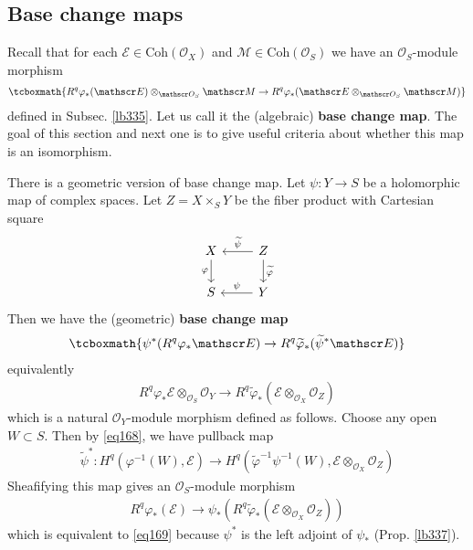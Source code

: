 \documentclass[12pt,b5paper,notitlepage]{report}
\theoremstyle{definition}
\theoremstyle{plain}
\newcommand{\wtd}{\widetilde}
\newcommand{\scr}{\mathscr}
\newcommand{\Coh}{\mathrm{Coh}}
\numberwithin{equation}{section}
\begin{document}
\subsection{Base change maps}

Recall that for each $\scr E\in\Coh(\scr O_X)$ and $\scr M\in\Coh(\scr O_S)$ we have an $\scr O_S$-module morphism 
\begin{align}
\tcboxmath{R^q\varphi_*(\scr E)\otimes_{\scr O_S}\scr M\rightarrow R^q\varphi_*(\scr E\otimes_{\scr O_S}\scr M)}   \label{eq167}
\end{align}
defined in Subsec. \ref{lb335}. Let us call it the (algebraic) \textbf{base change map}.  The goal of this section and next one is to give useful criteria about whether this map is an isomorphism. 

There is a geometric version of base change map. Let $\psi:Y\rightarrow S$ be a holomorphic map of complex spaces. Let $Z=X\times_SY$ be the fiber product with Cartesian square
\begin{equation}\label{eq171}
\begin{tikzcd}
X \arrow[d, "\varphi"'] & Z \arrow[l, "\wtd\psi"'] \arrow[d, "\wtd\varphi"] \\
S                       & Y \arrow[l, "\psi"']                             
\end{tikzcd}
\end{equation}
Then we have the (geometric) \textbf{base change map} 
\begin{align}
\tcboxmath{\psi^*(R^q\varphi_*\scr E)\rightarrow R^q\wtd\varphi_*(\wtd\psi^*\scr E)} \label{eq169}
\end{align}
equivalently
\begin{align*}
R^q\varphi_*\scr E\otimes_{\scr O_S}\scr O_Y\rightarrow R^q\wtd\varphi_*(\scr E\otimes_{\scr O_X}\scr O_Z)
\end{align*}
which is a natural $\scr O_Y$-module morphism defined as follows. Choose any open $W\subset S$. Then by \eqref{eq168}, we have pullback map 
\begin{align*}
\wtd\psi^*: H^q(\varphi^{-1}(W),\scr E)\rightarrow H^q(\wtd\varphi^{-1}\psi^{-1}(W),\scr E\otimes_{\scr O_X}\scr O_Z)
\end{align*}
Sheafifying this map gives an $\scr O_S$-module morphism
\begin{align*}
R^q\varphi_*(\scr E)\rightarrow \psi_* (R^q\wtd\varphi_*(\scr E\otimes_{\scr O_X}\scr O_Z))
\end{align*}
which is equivalent to \eqref{eq169} because $\psi^*$ is the left adjoint of $\psi_*$ (Prop. \ref{lb337}).
\end{document}
